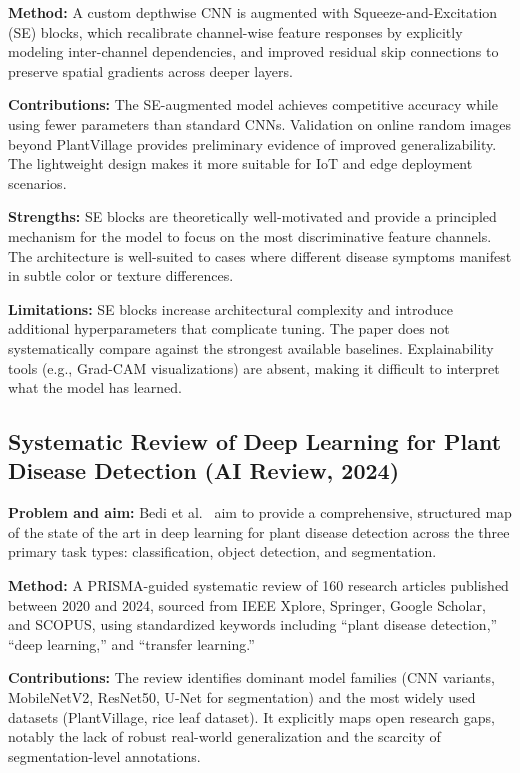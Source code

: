\documentclass[10pt,twocolumn]{article}
\begin{document}
\textbf{Method:} A custom depthwise CNN is augmented with Squeeze-and-Excitation (SE) blocks, which recalibrate channel-wise feature responses by explicitly modeling inter-channel dependencies, and improved residual skip connections to preserve spatial gradients across deeper layers.

\textbf{Contributions:} The SE-augmented model achieves competitive accuracy while using fewer parameters than standard CNNs. Validation on online random images beyond PlantVillage provides preliminary evidence of improved generalizability. The lightweight design makes it more suitable for IoT and edge deployment scenarios.

\textbf{Strengths:} SE blocks are theoretically well-motivated and provide a principled mechanism for the model to focus on the most discriminative feature channels. The architecture is well-suited to cases where different disease symptoms manifest in subtle color or texture differences.

\textbf{Limitations:} SE blocks increase architectural complexity and introduce additional hyperparameters that complicate tuning. The paper does not systematically compare against the strongest available baselines. Explainability tools (e.g., Grad-CAM visualizations) are absent, making it difficult to interpret what the model has learned.

\subsection{Systematic Review of Deep Learning for Plant Disease Detection (AI Review, 2024)}

\textbf{Problem and aim:} Bedi et al.\ \cite{AIReview2024} aim to provide a comprehensive, structured map of the state of the art in deep learning for plant disease detection across the three primary task types: classification, object detection, and segmentation.

\textbf{Method:} A PRISMA-guided systematic review of 160 research articles published between 2020 and 2024, sourced from IEEE Xplore, Springer, Google Scholar, and SCOPUS, using standardized keywords including ``plant disease detection,'' ``deep learning,'' and ``transfer learning.''

\textbf{Contributions:} The review identifies dominant model families (CNN variants, MobileNetV2, ResNet50, U-Net for segmentation) and the most widely used datasets (PlantVillage, rice leaf dataset). It explicitly maps open research gaps, notably the lack of robust real-world generalization and the scarcity of segmentation-level annotations.
\end{document}
